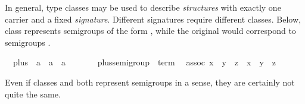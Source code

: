 \begin{isabellebody}
\begin{isamarkuptext}
 \medskip In general, type classes may be used to describe
 \emph{structures} with exactly one carrier  and a fixed
 \emph{signature}.  Different signatures require different classes.
 Below, class  represents semigroups of the form
 \isa{{\isacharparenleft}{\isasymtau}{\isacharcomma}\ {\isasymoplus}{\isacharparenright}}, while the original  would
 correspond to semigroups \isa{{\isacharparenleft}{\isasymtau}{\isacharcomma}\ {\isasymodot}{\isacharparenright}}.%
\end{isamarkuptext}%
\isanewline
\ \ plus\ {\isacharcolon}{\isacharcolon}\ {\isachardoublequote}{\isacharprime}a\ {\isasymRightarrow}\ {\isacharprime}a\ {\isasymRightarrow}\ {\isacharprime}a{\isachardoublequote}\ \ \ \ {\isacharparenleft}\ {\isachardoublequote}{\isasymoplus}{\isachardoublequote}\ {}{}{\isacharparenright}\isanewline
{}\ plus{\isacharunderscore}semigroup\ {\isacharless}\ {\isachardoublequote}term{\isachardoublequote}\isanewline
\ \ assoc{\isacharcolon}\ {\isachardoublequote}{\isacharparenleft}x\ {\isasymoplus}\ y{\isacharparenright}\ {\isasymoplus}\ z\ {\isacharequal}\ x\ {\isasymoplus}\ {\isacharparenleft}y\ {\isasymoplus}\ z{\isacharparenright}{\isachardoublequote}%
\begin{isamarkuptext}%
\noindent Even if classes  and  both represent semigroups in a sense, they are certainly
 not quite the same.%
\end{isamarkuptext}%
\end{isabellebody}%
